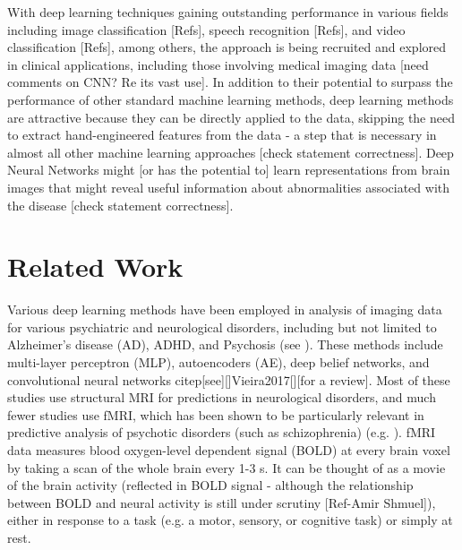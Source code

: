\documentclass{article}
\begin{document}
With deep learning techniques gaining outstanding performance in various fields including image classification [Refs], speech recognition [Refs], and video classification [Refs], among others, the approach is being recruited and explored in clinical applications, including those involving medical imaging data \citep{Shen2017, Litjens2017, Gulshan2016} [need comments on CNN? Re its vast use]. In addition to their potential to surpass the performance of other standard machine learning methods, deep learning methods are attractive because they can be directly applied to the data, skipping the need to extract hand-engineered features from the data - a step that is necessary in almost all other machine learning approaches [check statement correctness]. Deep Neural Networks might [or has the potential to] learn representations from brain images that might reveal useful information about abnormalities associated with the disease [check statement correctness].

\section{Related Work}

Various deep learning methods have been employed in analysis of imaging data for various psychiatric and neurological disorders, including but not limited to Alzheimer’s disease (AD), ADHD, and Psychosis (see \citep{Vieira2017}). These methods include multi-layer perceptron (MLP), autoencoders (AE), deep belief networks, and convolutional neural networks citep[see][]{Vieira2017}[][for a review]. Most of these studies use structural MRI for predictions in neurological disorders, and much fewer studies use fMRI, which has been shown to be particularly relevant in predictive analysis of psychotic disorders (such as schizophrenia) (e.g. \citep{Damaraju2014, Calhoun2009}). fMRI data measures blood oxygen-level dependent signal (BOLD) at every brain voxel by taking a scan of the whole brain every 1-3 s. It can be thought of as a movie of the brain activity (reflected in BOLD signal - although the relationship between BOLD and neural activity is still under scrutiny [Ref-Amir Shmuel]), either in response to a task (e.g. a motor, sensory, or cognitive task) or simply at rest.
\end{document}
